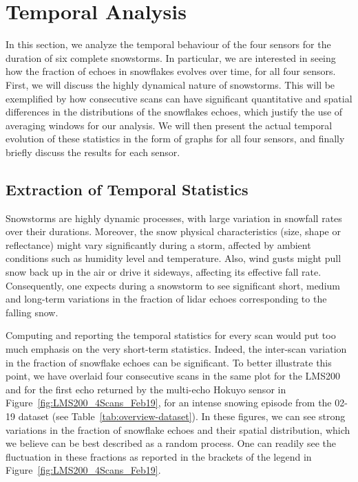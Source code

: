 \section{Temporal Analysis}
\label{sec:chap_lidar_temporal}

In this section, we analyze the temporal behaviour of the four sensors for the duration of six complete snowstorms. In particular, we are interested in seeing how the fraction of echoes in snowflakes evolves over time, for all four sensors. First, we will discuss the highly dynamical nature of snowstorms. This will be exemplified by how consecutive scans can have significant quantitative and spatial differences in the distributions of the snowflakes echoes, which justify the use of averaging windows for our analysis. We will then present the actual temporal evolution of these statistics in the form of graphs for all four sensors, and finally briefly discuss the results for each sensor.

\subsection{Extraction of Temporal Statistics}

Snowstorms are highly dynamic processes, with large variation in snowfall rates over their durations. Moreover, the snow physical characteristics (size, shape or reflectance) might vary significantly during a storm, affected by ambient conditions such as humidity level and temperature. Also, wind gusts might pull snow back up in the air or drive it sideways, affecting its effective fall rate. Consequently, one expects during a snowstorm to see significant short, medium and long-term variations in the fraction of \gls*{lidar} echoes corresponding to the falling snow.

Computing and reporting the temporal statistics for every scan would put too much emphasis on the very short-term statistics. Indeed, the inter-scan variation in the fraction of snowflake echoes can be significant. To better illustrate this point, we have overlaid four consecutive scans in the same plot for the LMS200 and for the first echo returned by the multi-echo Hokuyo sensor in Figure~\ref{fig:LMS200_4Scans_Feb19}, for an intense snowing episode from the 02-19 dataset (see Table~\ref{tab:overview-dataset}). In these figures, we can see strong variations in the fraction of snowflake echoes and their spatial distribution, which we believe can be best described as a random process. One can readily see the fluctuation in these fractions as reported in the brackets of the legend in Figure~\ref{fig:LMS200_4Scans_Feb19}.

